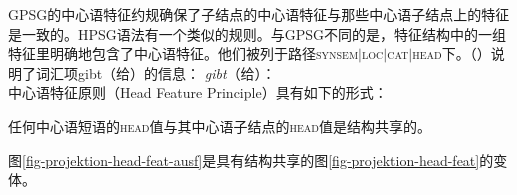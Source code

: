 GPSG\indexgpsgc 的中心语特征约规确保了子结点的中心语特征与那些中心语子结点上的特征是一致的。HPSG语法有一个类似的规则。与GPSG不同的是，特征结构中的一组特征里明确地包含了中心语特征。他们被列于路径\textsc{synsem$|$loc$|$cat$|$head}下。（）说明了词汇项gibt（给）的信息：
\eas
\emph{gibt}（给）：\\
\zs
中心语特征原则（Head Feature Principle）具有如下的形式：
\begin{principle-break}[中心语特征原则]
\label{prinzip-hfp}
任何中心语短语的\textsc{head}值与其中心语子结点的\textsc{head}值是结构共享的。
\end{principle-break}
图\ref{fig-projektion-head-feat-ausf}是具有结构共享的图\ref{fig-projektion-head-feat}的变体。
